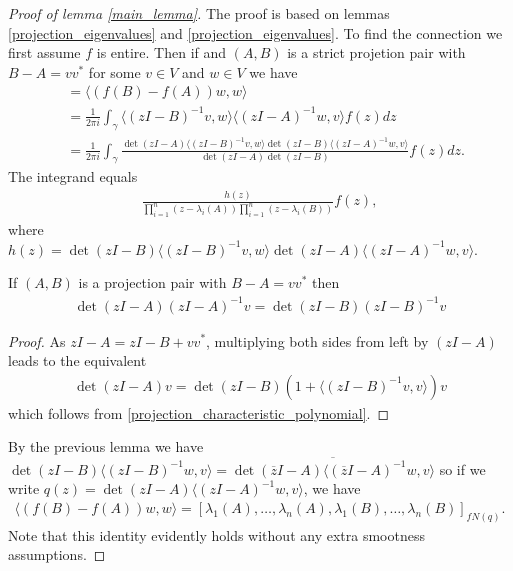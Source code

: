 \begin{proof}[Proof of lemma \ref{main_lemma}]
	The proof is based on lemmas \ref{projection_eigenvalues} and \ref{projection_eigenvalues}. To find the connection we first assume $f$ is entire. Then if and $(A, B)$ is a strict projetion pair with $B - A = v v^{*}$ for some $v \in V$ and $w \in V$ we have
	\begin{align*}
		&= \langle (f(B) - f(A)) w, w \rangle \\
		&= \frac{1}{2 \pi i}\int_{\gamma} \langle (z I - B)^{-1} v, w \rangle  \langle (z I - A)^{-1} w, v \rangle f(z) dz \\
		&= \frac{1}{2 \pi i}\int_{\gamma} \frac{\det(z I - A)\langle (z I - B)^{-1} v, w \rangle \det(z I - B) \langle (z I - A)^{-1} w, v \rangle}{\det(z I - A) \det(z I - B)} f(z) dz.
	\end{align*}
	The integrand equals
	\begin{align*}
		\frac{h(z)}{\prod_{i = 1}^{n}(z - \lambda_{i}(A)) \prod_{i = 1}^{n}(z - \lambda_{i}(B))} f(z),
	\end{align*}
	where $h(z) = \det(z I - B)\langle (z I - B)^{-1} v, w \rangle \det(z I - A) \langle (z I - A)^{-1} w, v \rangle$.
	\begin{lem}
		If $(A, B)$ is a projection pair with $B - A = v v^{*}$ then
		\begin{align*}
			\det(z I - A) (z I - A)^{-1} v = \det(z I - B) (z I - B)^{-1} v
		\end{align*} 
	\end{lem}
	\begin{proof}
		As $z I - A = z I - B + v v^{*}$, multiplying both sides from left by $(z I - A)$ leads to the equivalent
		\begin{align*}
			\det(z I - A) v = \det(z I - B) (1 + \langle (z I - B)^{-1} v, v \rangle) v
		\end{align*}
		which follows from \ref{projection_characteristic_polynomial}.
	\end{proof}
	By the previous lemma we have $\det(z I - B) \langle (z I - B)^{-1} w, v \rangle = \overline{\det(\overline{z} I - A) \langle (\overline{z} I - A)^{-1} w, v \rangle}$ so
	if we write $q(z) = \det(z I - A) \langle (z I - A)^{-1} w, v \rangle$, we have
	\begin{align*}
		\langle (f(B) - f(A)) w, w \rangle = [\lambda_{1}(A), \ldots, \lambda_{n}(A), \lambda_{1}(B), \ldots, \lambda_{n}(B)]_{f N(q)}.
	\end{align*}
	Note that this identity evidently holds without any extra smootness assumptions.


\end{proof}
